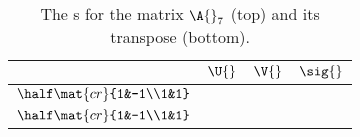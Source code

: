 \clearpage
\thispagestyle{empty}
\begin{landscape}
\begin{table}[htdp]
\caption[The \asvd s for the matrix $\A{}_{7}$]{The \asvd s for the matrix $\A{}_{7}$ (top) and its transpose (bottom).}
\begin{center}
\begin{tabular}{lccc}
%
  & $\U{}$ & \quad $\V{}$ & \quad $\sig{}$ \\[10pt]\hline
%
 $\half \mat{cr}{1&-1\\1&1}$ &
\raisebox{-0.5\height}{\includegraphics[ width = 1.5in ]   {images/bases/pies/"A7 U"}}  & \quad
\raisebox{-0.5\height}{\includegraphics[ width = 1.5in ]   {images/bases/pies/"A7 V"}} & \quad
\raisebox{-0.5\height}{\includegraphics[ width = 2.427in ] {images/bases/pies/"A7 S"}} \\[10pt]
%
 $\half \mat{cr}{1&-1\\1&1}$ &
\raisebox{-0.5\height}{\includegraphics[ width = 1.5in ]   {images/bases/pies/"A7T U"}}  & \quad
\raisebox{-0.5\height}{\includegraphics[ width = 1.5in ]   {images/bases/pies/"A7T V"}} & \quad
\raisebox{-0.5\height}{\includegraphics[ width = 2.427in ] {images/bases/pies/"A7  S"}} 
%
\end{tabular}
\end{center}
\label{tab:pie:a7}
\end{table}
\end{landscape}

\endinput